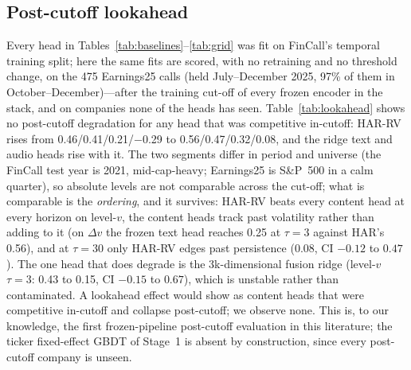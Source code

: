 \subsection{Post-cutoff lookahead}
\label{sec:results-lookahead}
Every head in Tables~\ref{tab:baselines}--\ref{tab:grid} was fit on FinCall's
temporal training split; here the same fits are scored, with no retraining and no
threshold change, on the 475 Earnings25 calls (held July--December 2025, 97\% of
them in October--December)---after the training cut-off of every frozen encoder in
the stack, and on companies none of the heads has seen. Table~\ref{tab:lookahead}
shows no post-cutoff degradation for any head that was competitive in-cutoff: HAR-RV
rises from 0.46/0.41/0.21/$-$0.29 to 0.56/0.47/0.32/0.08, and the ridge text and
audio heads rise with it. The two segments differ in period and universe (the
FinCall test year is 2021, mid-cap-heavy; Earnings25 is S\&P~500 in a calm
quarter), so absolute levels are not comparable across the cut-off; what is
comparable is the \emph{ordering}, and it survives: HAR-RV beats every content head
at every horizon on level-$v$, the content heads track past volatility rather than
adding to it (on $\Delta v$ the frozen text head reaches 0.25 at $\tau{=}3$ against
HAR's 0.56), and at $\tau{=}30$ only HAR-RV edges past persistence (0.08, CI
$-0.12$ to $0.47$). The one head that does degrade is the 3k-dimensional fusion
ridge (level-$v$ $\tau{=}3$: 0.43 to 0.15, CI $-0.15$ to $0.67$), which is unstable
rather than contaminated. A lookahead effect would show as content heads that were
competitive in-cutoff and collapse post-cutoff; we observe none. This is, to our
knowledge, the first frozen-pipeline post-cutoff evaluation in this literature; the
ticker fixed-effect GBDT of Stage~1 is absent by construction, since every
post-cutoff company is unseen.


